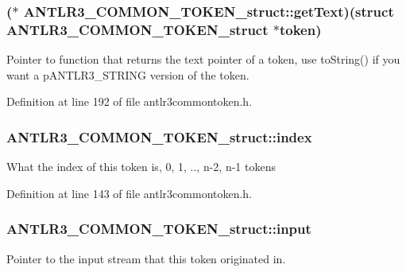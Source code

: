 \hypertarget{struct_a_n_t_l_r3___c_o_m_m_o_n___t_o_k_e_n__struct_a8b903dff51ace5fc2af285d9a9828e28}{
\subsubsection[{get\-Text}]{($\ast$ A\-N\-T\-L\-R3\-\_\-\-C\-O\-M\-M\-O\-N\-\_\-\-T\-O\-K\-E\-N\-\_\-struct\-::get\-Text)(struct {\bf A\-N\-T\-L\-R3\-\_\-\-C\-O\-M\-M\-O\-N\-\_\-\-T\-O\-K\-E\-N\-\_\-struct} $\ast$token)}}\label{struct_a_n_t_l_r3___c_o_m_m_o_n___t_o_k_e_n__struct_a8b903dff51ace5fc2af285d9a9828e28}
Pointer to function that returns the text pointer of a token, use to\-String() if you want a p\-A\-N\-T\-L\-R3\-\_\-\-S\-T\-R\-I\-N\-G version of the token. 

Definition at line 192 of file antlr3commontoken.\-h.

\hypertarget{struct_a_n_t_l_r3___c_o_m_m_o_n___t_o_k_e_n__struct_aa4e14f542df2d0c11835264d7bd8afe3}{
\subsubsection[{index}]{ A\-N\-T\-L\-R3\-\_\-\-C\-O\-M\-M\-O\-N\-\_\-\-T\-O\-K\-E\-N\-\_\-struct\-::index}}\label{struct_a_n_t_l_r3___c_o_m_m_o_n___t_o_k_e_n__struct_aa4e14f542df2d0c11835264d7bd8afe3}
What the index of this token is, 0, 1, .., n-\/2, n-\/1 tokens 

Definition at line 143 of file antlr3commontoken.\-h.

\hypertarget{struct_a_n_t_l_r3___c_o_m_m_o_n___t_o_k_e_n__struct_a8e4b164d9d042904977ab10b724d9679}{
\subsubsection[{input}]{ A\-N\-T\-L\-R3\-\_\-\-C\-O\-M\-M\-O\-N\-\_\-\-T\-O\-K\-E\-N\-\_\-struct\-::input}}\label{struct_a_n_t_l_r3___c_o_m_m_o_n___t_o_k_e_n__struct_a8e4b164d9d042904977ab10b724d9679}
Pointer to the input stream that this token originated in. 

